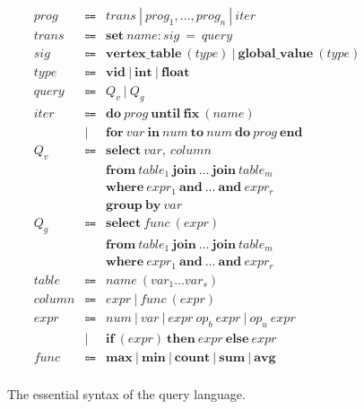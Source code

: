 \documentclass{sokendai_thesis} %
\newcommand{\hsp}[1]{\hspace{-3em}\hbox{#1}}
\begin{document}
\begin{figure}[t]
\normalsize
\[
\begin{array}{lclr}
\mathit{prog} & \Coloneqq & \mathit{trans}~|~\mathit{prog_1},\ldots,\mathit{prog_n}~|~\mathit{iter} \\
\mathit{trans} & \Coloneqq & \mathbf{set}~\mathit{name}:\mathit{sig}~=~\mathit{query} \\
\mathit{sig} & \Coloneqq & \mathbf{vertex\_table}~(\mathit{type})~|~\mathbf{global\_value}~(\mathit{type}) \\
\mathit{type} & \Coloneqq & \mathbf{vid}~|~\mathbf{int}~|~\mathbf{float} \\
\mathit{query} & \Coloneqq & \mathit{Q_v}~|~\mathit{Q_g} \\
\mathit{iter} & \Coloneqq & \mathbf{do}~\mathit{prog}~\mathbf{until}~\mathbf{fix}~(\mathit{name}) \\
 & | & \mathbf{for}~\mathit{var}~\mathbf{in}~\mathit{num}~\mathbf{to}~\mathit{num}~\mathbf{do}~\mathit{prog}~\mathbf{end} \\
\mathit{Q_{v}}  & \Coloneqq & \mathbf{select}~\mathit{var},~\mathit{column} \\
 & & \mathbf{from}~\mathit{table_1}~\mathbf{join}~\ldots~\mathbf{join}~\mathit{table_m} \\
 & & \mathbf{where}~\mathit{expr_1}~\mathbf{and}~\ldots~\mathbf{and}~\mathit{expr_r} \\
 & & \mathbf{group~by}~\mathit{var} \\
\mathit{Q_{g}}  & \Coloneqq & \mathbf{select}~\mathit{func}~(\mathit{expr}) \\
 & & \mathbf{from}~\mathit{table_1}~\mathbf{join}~\ldots~\mathbf{join}~\mathit{table_m} \\
 & & \mathbf{where}~\mathit{expr_1}~\mathbf{and}~\ldots~\mathbf{and}~\mathit{expr_r} \\
\mathit{table} & \Coloneqq & \mathit{name}~(\mathit{var}_1\ldots\mathit{var}_s) \\
\mathit{column} & \Coloneqq & \mathit{expr}~|~\mathit{func}~(\mathit{expr}) \\
\mathit{expr}  & \Coloneqq & \mathit{num}~|~\mathit{var}~|~\mathit{expr}~\mathit{op_b}~\mathit{expr}~|~\mathit{op_u}~\mathit{expr} \\
 & | & \mathbf{if}~(\mathit{expr})~\mathbf{then}~\mathit{expr}~\mathbf{else}~\mathit{expr} \\
\mathit{func} & \Coloneqq & \mathbf{max}~|~\mathbf{min}~|~\mathbf{count}~|~\mathbf{sum}~|~\mathbf{avg} \\
\end{array}
\]
\caption{The essential syntax of the query language.}
\label{fig:palgol-syntax}
\end{figure}
\end{document}
